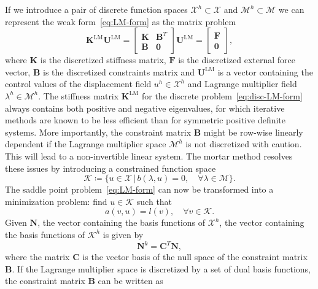 If we introduce a pair of discrete function spaces $\mathcal{X}^h \subset \mathcal{X}$ and $\mathcal{M}^h \subset \mathcal{M}$ we can represent the weak form~\eqref{eq:LM-form} as the matrix problem
\begin{equation}\label{eq:disc-LM-form}
  \mathbf{K}^\text{LM}\mathbf{U}^{\text{LM}}=\begin{bmatrix}
    \mathbf{K} & \mathbf{B}^T \\
    \mathbf{B} & \mathbf{0}
  \end{bmatrix}\mathbf{U}^{\text{LM}}
  =
  \begin{bmatrix}
    \mathbf{F} \\
    \mathbf{0}
  \end{bmatrix},
\end{equation}
where $\mathbf{K}$ is the discretized stiffness matrix, $\mathbf{F}$ is the discretized external force vector, $\mathbf{B}$ is the discretized constraints matrix and $\mathbf{U}^{\text{LM}}$ is a vector containing the control values of the displacement field $u^h \in \mathcal{X}^h$ and Lagrange multiplier field $\lambda^h \in \mathcal{M}^h$. The stiffness matrix $\mathbf{K}^\text{LM}$ for the discrete problem~\eqref{eq:disc-LM-form} always contains both positive and negative eigenvalues, for which iterative methods are known to be less efficient than for symmetric positive definite systems. More importantly, the constraint matrix $\mathbf{B}$ might be row-wise linearly dependent if the Lagrange multiplier space $\mathcal{M}^h$ is not discretized with caution. This will lead to a non-invertible linear system. The mortar method resolves these issues by introducing a constrained function space
\begin{equation}
  \mathcal{K}\coloneq\{u\in\mathcal{X}\, | \, b(\lambda,u)=0, \quad \forall{}\lambda\in\mathcal{M}\}.
\end{equation}
The saddle point problem~\eqref{eq:LM-form} can now be transformed into a minimization problem: find $u\in\mathcal{K}$ such that
\begin{equation}
  a(v, u)=l(v),\quad \forall{}v\in\mathcal{K}.
\end{equation}
Given $\mathbf{N}$, the vector containing the basis functions of $\mathcal{X}^h$, the vector containing the basis functions of $\mathcal{K}^h$ is given by
\begin{equation}
  \mathbf{N}^k=\mathbf{C}^T\mathbf{N},\label{eq:basis-null-space}
\end{equation}
where the matrix $\mathbf{C}$ is the vector basis of the null space of the constraint matrix $\mathbf{B}$. If the Lagrange multiplier space is discretized by a set of dual basis functions, the constraint matrix $\mathbf{B}$ can be written as~\cite{gilbert1987computing}
